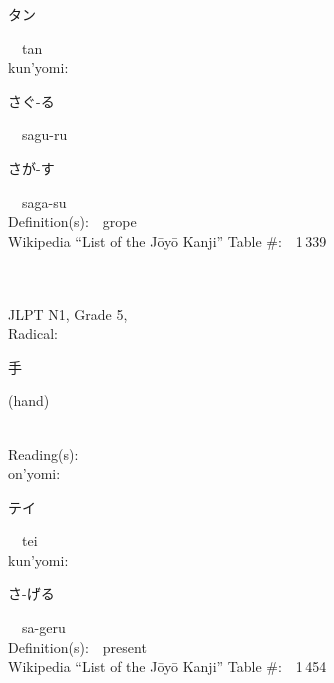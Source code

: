 \begin{multicols}{2}
{\hspace*{2em}}{\begin{CJK}{UTF8}{min} タン \end{CJK}}\ \ tan\ \ \\
{\hspace*{1em}}kun'yomi:\ \ \\
{\hspace*{2em}}{\begin{CJK}{UTF8}{min} さぐ-る \end{CJK}}\ \ sagu-ru\ \ \\
{\hspace*{2em}}{\begin{CJK}{UTF8}{min} さが-す \end{CJK}}\ \ saga-su\ \ \\
Definition(s):\ \ grope \\
Wikipedia ``List of the J\=oy\=o Kanji'' Table \#:\ \ 1\,339 \\
\ \ \\
{\fontsize{34pt}{40pt}  }\ \ \\  %
{JLPT N1, Grade 5, \\Radical:\ \ {\begin{CJK}{UTF8}{min} 手 \end{CJK}} (hand) } \\
Reading(s):\ \ \\
{\hspace*{1em}}on'yomi:\ \ \\
{\hspace*{2em}}{\begin{CJK}{UTF8}{min} テイ \end{CJK}}\ \ tei\ \ \\
{\hspace*{1em}}kun'yomi:\ \ \\
{\hspace*{2em}}{\begin{CJK}{UTF8}{min} さ-げる \end{CJK}}\ \ sa-geru\ \ \\
Definition(s):\ \ present \\
Wikipedia ``List of the J\=oy\=o Kanji'' Table \#:\ \ 1\,454 \\
\ \ \\
{\fontsize{34pt}{40pt}  }\ \ \\  %

\end{multicols}
